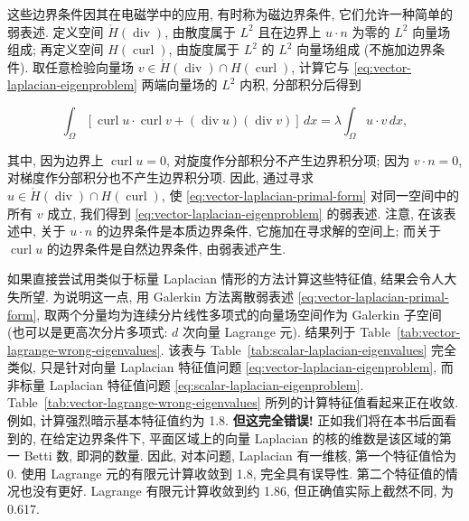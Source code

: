 {这些边界条件因其在电磁学中的应用, 有时称为磁边界条件, 它们允许一种简单的弱表述. 定义空间 $\mathring H(\operatorname{div})$, 由散度属于 $L^2$ 且在边界上 $u\cdot n$ 为零的 $L^2$ 向量场组成; 再定义空间 $H(\operatorname{curl})$, 由旋度属于 $L^2$ 的 $L^2$ 向量场组成 (不施加边界条件). 取任意检验向量场 $v\in\mathring H(\operatorname{div})\cap H(\operatorname{curl})$, 计算它与 \eqref{eq:vector-laplacian-eigenproblem} 两端向量场的 $L^2$ 内积, 分部积分后得到}

\begin{equation}\label{eq:vector-laplacian-primal-form}
\int_\Omega[\operatorname{curl}u\cdot\operatorname{curl}v+(\operatorname{div}u)(\operatorname{div}v)]\,dx=\lambda\int_\Omega u\cdot v\,dx,
\end{equation}

{其中, 因为边界上 $\operatorname{curl}u=0$, 对旋度作分部积分不产生边界积分项; 因为 $v\cdot n=0$, 对梯度作分部积分也不产生边界积分项. 因此, 通过寻求 $u\in\mathring H(\operatorname{div})\cap H(\operatorname{curl})$, 使 \eqref{eq:vector-laplacian-primal-form} 对同一空间中的所有 $v$ 成立, 我们得到 \eqref{eq:vector-laplacian-eigenproblem} 的弱表述. 注意, 在该表述中, 关于 $u\cdot n$ 的边界条件是本质边界条件, 它施加在寻求解的空间上; 而关于 $\operatorname{curl}u$ 的边界条件是自然边界条件, 由弱表述产生.}

{如果直接尝试用类似于标量 Laplacian 情形的方法计算这些特征值, 结果会令人大失所望. 为说明这一点, 用 Galerkin 方法离散弱表述 \eqref{eq:vector-laplacian-primal-form}, 取两个分量均为连续分片线性多项式的向量场空间作为 Galerkin 子空间 (也可以是更高次分片多项式: $d$ 次向量 Lagrange 元). 结果列于 Table~\ref{tab:vector-lagrange-wrong-eigenvalues}. 该表与 Table~\ref{tab:scalar-laplacian-eigenvalues} 完全类似, 只是针对向量 Laplacian 特征值问题 \eqref{eq:vector-laplacian-eigenproblem}, 而非标量 Laplacian 特征值问题 \eqref{eq:scalar-laplacian-eigenproblem}. Table~\ref{tab:vector-lagrange-wrong-eigenvalues} 所列的计算特征值看起来正在收敛. 例如, 计算强烈暗示基本特征值约为 1.8. \textbf{但这完全错误!} 正如我们将在本书后面看到的, 在给定边界条件下, 平面区域上的向量 Laplacian 的核的维数是该区域的第一 Betti 数, 即洞的数量. 因此, 对本问题, Laplacian 有一维核, 第一个特征值恰为 0. 使用 Lagrange 元的有限元计算收敛到 1.8, 完全具有误导性. 第二个特征值的情况也没有更好. Lagrange 有限元计算收敛到约 1.86, 但正确值实际上截然不同, 为 0.617.}

